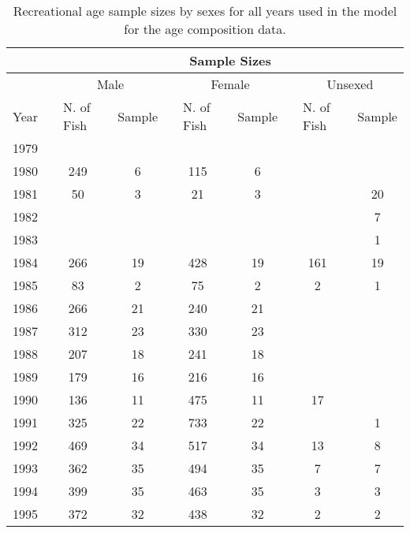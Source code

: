 \begingroup\fontsize{10}{12}\selectfont
\begingroup\fontsize{10}{12}\selectfont

\begin{table}[]
\caption{Recreational age sample sizes by sexes for all years used in the model for the age composition data.}
\label{tab:rec_age_sample}
\begin{tabular}{rlclccccccccc}
\hline
\multicolumn{1}{l}{} &  & \multicolumn{11}{c}{Sample Sizes} \\ \hline
\multicolumn{1}{l}{} &  & \multicolumn{3}{c}{Male} & \multicolumn{1}{l}{} & \multicolumn{3}{c}{Female} & \multicolumn{1}{l}{} & \multicolumn{3}{c}{Unsexed} \\ \cline{3-5} \cline{7-9} \cline{11-13} 
\multicolumn{1}{l}{Year} &  & \multicolumn{1}{l}{N. of  Fish} &  & \multicolumn{1}{l}{Sample} & \multicolumn{1}{l}{} & \multicolumn{1}{l}{N. of Fish} & \multicolumn{1}{l}{} & \multicolumn{1}{l}{Sample} & \multicolumn{1}{l}{} & \multicolumn{1}{l}{N. of Fish} & \multicolumn{1}{l}{} & \multicolumn{1}{l}{Sample} \\ \hline
1979 &  &  &  &  &  &  &  &  &  &  &  &  \\
1980 &  & 249 &  & 6 &  & 115 &  & 6 &  &  &  &  \\
1981 &  & 50 &  & 3 &  & 21 &  & 3 &  &  &  & 20 \\
1982 &  &  &  &  &  &  &  &  &  &  &  & 7 \\
1983 &  &  &  &  &  &  &  &  &  &  &  & 1 \\
1984 &  & 266 &  & 19 &  & 428 &  & 19 &  & 161 &  & 19 \\
1985 &  & 83 &  & 2 &  & 75 &  & 2 &  & 2 &  & 1 \\
1986 &  & 266 &  & 21 &  & 240 &  & 21 &  &  &  &  \\
1987 &  & 312 &  & 23 &  & 330 &  & 23 &  &  &  &  \\
1988 &  & 207 &  & 18 &  & 241 &  & 18 &  &  &  &  \\
1989 &  & 179 &  & 16 &  & 216 &  & 16 &  &  &  &  \\
1990 &  & 136 &  & 11 &  & 475 &  & 11 &  & 17 &  &  \\
1991 &  & 325 &  & 22 &  & 733 &  & 22 &  &  &  & 1 \\
1992 &  & 469 &  & 34 &  & 517 &  & 34 &  & 13 &  & 8 \\
1993 &  & 362 &  & 35 &  & 494 &  & 35 &  & 7 &  & 7 \\
1994 &  & 399 &  & 35 &  & 463 &  & 35 &  & 3 &  & 3 \\
1995 &  & 372 &  & 32 &  & 438 &  & 32 &  & 2 &  & 2 \\

\end{tabular}
\end{table}

